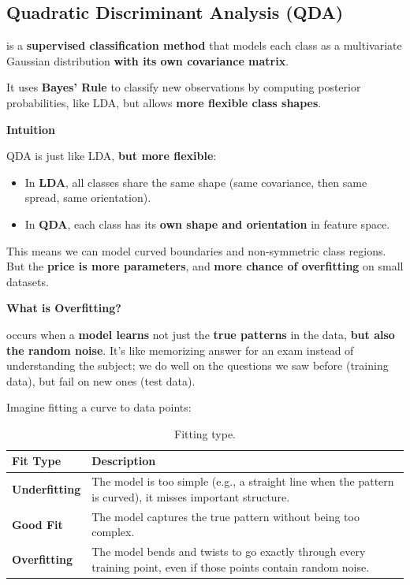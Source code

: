 \subsection{Quadratic Discriminant Analysis (QDA)}

 is a \textbf{supervised classification method} that models each class as a multivariate Gaussian distribution \textbf{with its own covariance matrix}.

\highspace
It uses \textbf{Bayes' Rule} to classify new observations by computing posterior probabilities, like LDA, but allows \textbf{more flexible class shapes}.

\highspace
\begin{flushleft}
    \textcolor{Green3}{ \textbf{Intuition}}
\end{flushleft}
QDA is just like LDA, \textbf{but more flexible}:
\begin{itemize}
    \item In \textbf{LDA}, all classes share the same shape (same covariance, then same spread, same orientation).
    \item In \textbf{QDA}, each class has its \textbf{own shape and orientation} in feature space.
\end{itemize}
This means we can model curved boundaries and non-symmetric class regions. But the \textbf{price is more parameters}, and \textbf{more chance of overfitting} on small datasets.

\highspace
\begin{flushleft}
    \textcolor{Red2}{ \textbf{What is Overfitting?}}
\end{flushleft}
 occurs when a \textbf{model learns} not just the \textbf{true patterns} in the data, \textbf{but also the random noise}. It's like memorizing answer for an exam instead of understanding the subject; we do well on the questions we saw before (training data), but fail on new ones (test data).

\highspace
Imagine fitting a curve to data points:
\begin{table}[!htp]
    \centering
    \begin{tabular}{@{} l | p{20em} @{}}
        \toprule
        Fit Type & Description \\
        \midrule
        \textbf{Underfitting}   & The model is too simple (e.g., a straight line when the pattern is curved), it misses important structure. \\ [.5em]
        \textbf{Good Fit}       & The model captures the true pattern without being too complex. \\ [.5em]
        \textbf{Overfitting}    & The model bends and twists to go exactly through every training point, even if those points contain random noise. \\
        \bottomrule
    \end{tabular}
    \caption{Fitting type.}
\end{table}


